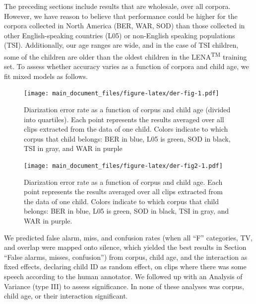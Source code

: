 \documentclass[english,floatsintext,man]{apa6}
\begin{document}
The preceding sections include results that are wholesale, over all
corpora. However, we have reason to believe that performance could be
higher for the corpora collected in North America (BER, WAR, SOD) than
those collected in other English-speaking countries (L05) or non-English
speaking populations (TSI). Additionally, our age ranges are wide, and
in the case of TSI children, some of the children are older than the
oldest children in the LENA\textsuperscript{TM} training set. To assess
whether accuracy varies as a function of corpora and child age, we fit
mixed models as follows.

\begin{figure}
\centering
\texttt{[image: main\_document\_files/figure-latex/der-fig-1.pdf]}
\caption{\label{fig:der-fig}Diarization error rate as a function of corpus
and child age (divided into quartiles). Each point represents the
results averaged over all clips extracted from the data of one child.
Colors indicate to which corpus that child belongs: BER in blue, L05 is
green, SOD in black, TSI in gray, and WAR in purple}
\end{figure}

\begin{figure}
\centering
\texttt{[image: main\_document\_files/figure-latex/der-fig2-1.pdf]}
\caption{\label{fig:der-fig2}Diarization error rate as a function of corpus
and child age. Each point represents the results averaged over all clips
extracted from the data of one child. Colors indicate to which corpus
that child belongs: BER in blue, L05 is green, SOD in black, TSI in
gray, and WAR in purple.}
\end{figure}

We predicted false alarm, miss, and confusion rates (when all
\enquote{F} categories, TV, and overlap were mapped onto silence, which
yielded the best results in Section \enquote{False alarms, misses,
confusion}) from corpus, child age, and the interaction as fixed
effects, declaring child ID as random effect, on clips where there was
some speech according to the human annotator. We followed up with an
Analysis of Variance (type III) to assess significance. In none of these
analyses was corpus, child age, or their interaction significant.
\end{document}
